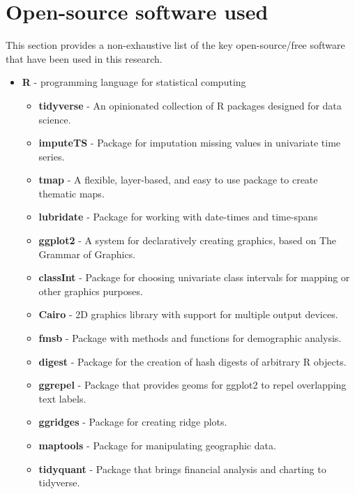 \vspace{1em}
\inputminted{javascript}{analysis/data-collection/samplepacket.json}
\pagebreak

\section{Open-source software used}\label{appendix:software}

This section provides a non-exhaustive list of the key open-source/free software that have been used in this research.

\begin{itemize}
\item \textbf{R} - programming language for statistical computing
    \begin{itemize}
      \item \textbf{tidyverse} - An opinionated collection of R packages designed for data science. 
      \item \textbf{imputeTS} - Package for imputation missing values in univariate time series.
      \item \textbf{tmap} - A flexible, layer-based, and easy to use package to create thematic maps.
      \item \textbf{lubridate} - Package for working with date-times and time-spans
      \item \textbf{ggplot2} - A system for declaratively creating graphics, based on The Grammar of Graphics.
      \item \textbf{classInt} -  Package for choosing univariate class intervals for mapping or other graphics purposes.
      \item \textbf{Cairo} - 2D graphics library with support for multiple output devices.
      \item \textbf{fmsb} - Package with methods and functions for demographic analysis.
      \item \textbf{digest} - Package for the creation of hash digests of arbitrary R objects.
      \item \textbf{ggrepel} - Package that provides geoms for ggplot2 to repel overlapping text labels.
      \item \textbf{ggridges} - Package for creating ridge plots.
      \item \textbf{maptools} - Package for manipulating geographic data.
      \item \textbf{tidyquant} - Package that brings financial analysis and charting to tidyverse.

\end{itemize}
\end{itemize}
